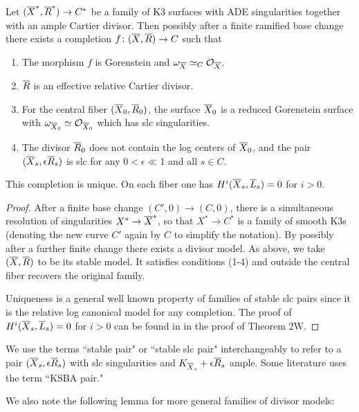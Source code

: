 \documentclass[table,x11names]{amsart}
\begin{document}
\begin{theorem}\label{thm:1-param-limit}
  Let $({\overline X}^*, {\overline R}^*)\to C^*$ be a family of K3 surfaces with ADE
  singularities together with an ample Cartier divisor. Then possibly
  after a finite ramified base change there exists a completion
  $f\colon ({\overline X},{\overline R})\to C$ such that
  \begin{enumerate}
  \item The morphism $f$ is Gorenstein and $\omega_{\overline X} \simeq_C
    {\mathcal O}_{\overline X}$.
  \item ${\overline R}$ is an effective relative Cartier divisor.
  \item For the central fiber $({\overline X}_0,{\overline R}_0)$, the
    surface ${\overline X}_0$ is a reduced Gorenstein surface with
    $\omega_{{\overline X}_0}\simeq {\mathcal O}_{{\overline X}_0}$ which has slc singularities.
  \item The divisor ${\overline R}_0$ does not contain the log centers of
    ${\overline X}_0$, and the pair $({\overline X}_s,\epsilon{\overline R}_s)$ is slc for any
    $0<\epsilon\ll1$ and all $s\in C$.
  \end{enumerate}
  This completion is unique. On each fiber one has
  $H^i({\overline X}_s,{\overline L}_s)=0$ for $i>0$.
\end{theorem}
\begin{proof}
  After a finite base change $(C',0)\to (C,0)$, there is a
  simultaneous resolution of singularities $X^*\to {\overline X}^*$, so that
  $X^*\to C^*$ is a family of smooth K3s (denoting the new curve
  $C'$ again by $C$ to simplify the notation). By
  \cite[3.13]{alexeev2019stable-pair} possibly after a further finite
  change there exists a divisor model. As above, we take $({\overline X},{\overline R})$
  to be its stable model. It satisfies conditions (1-4) and outside
  the central fiber recovers the original family.

  Uniqueness is a general well known property of families of stable
  slc pairs since it is the relative log canonical model for any
  completion.  The proof of $H^i({\overline X}_s,{\overline L}_s)=0$ for $i>0$ can be
  found in \cite[p.155]{shepherd-barron1981extending-polarizations} in
  the proof of Theorem 2W.
\end{proof}

We use the terms ``stable pair" or ``stable slc pair" interchangeably
to refer to a pair $({\overline X}_s,\epsilon{\overline R}_s)$ with slc singularities 
and $K_{{\overline X}_s}+\epsilon {\overline R}_s$ ample.
Some literature uses the term ``KSBA pair."

We also note the following lemma for more general families of divisor
models: 
\end{document}

